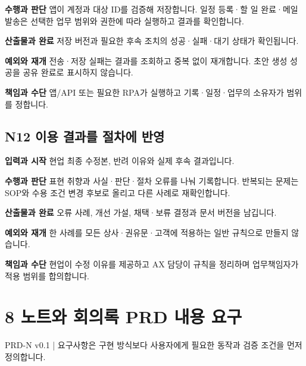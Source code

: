 \documentclass[a4paper,10pt]{article}
\begin{document}
\noindent\textbf{수행과 판단} 앱이 계정과 대상 ID를 검증해 저장합니다. 일정 등록·할 일 완료·메일 발송은 선택한 업무 범위와 권한에 따라 실행하고 결과를 확인합니다.


\noindent\textbf{산출물과 완료} 저장 버전과 필요한 후속 조치의 성공·실패·대기 상태가 확인됩니다.


\noindent\textbf{예외와 재개} 전송·저장 실패는 결과를 조회하고 중복 없이 재개합니다. 초안 생성 성공을 공유 완료로 표시하지 않습니다.


\noindent\textbf{책임과 수단} 앱/API 또는 필요한 RPA가 실행하고 기록·일정·업무의 소유자가 범위를 정합니다.


\endgroup
\begingroup\setlength{\parskip}{3pt}
\subsection*{N12 이용 결과를 절차에 반영}
\noindent\textbf{입력과 시작} 현업 최종 수정본, 반려 이유와 실제 후속 결과입니다.


\noindent\textbf{수행과 판단} 표현 취향과 사실·판단·절차 오류를 나눠 기록합니다. 반복되는 문제는 SOP와 수용 조건 변경 후보로 올리고 다른 사례로 재확인합니다.


\noindent\textbf{산출물과 완료} 오류 사례, 개선 가설, 채택·보류 결정과 문서 버전을 남깁니다.


\noindent\textbf{예외와 재개} 한 사례를 모든 상사·권유문·고객에 적용하는 일반 규칙으로 만들지 않습니다.


\noindent\textbf{책임과 수단} 현업이 수정 이유를 제공하고 AX 담당이 규칙을 정리하며 업무책임자가 적용 범위를 합의합니다.


\endgroup
\clearpage
\section*{8 노트와 회의록 PRD 내용 요구}
PRD-N v0.1  |  요구사항은 구현 방식보다 사용자에게 필요한 동작과 검증 조건을 먼저 정의합니다.
\end{document}
